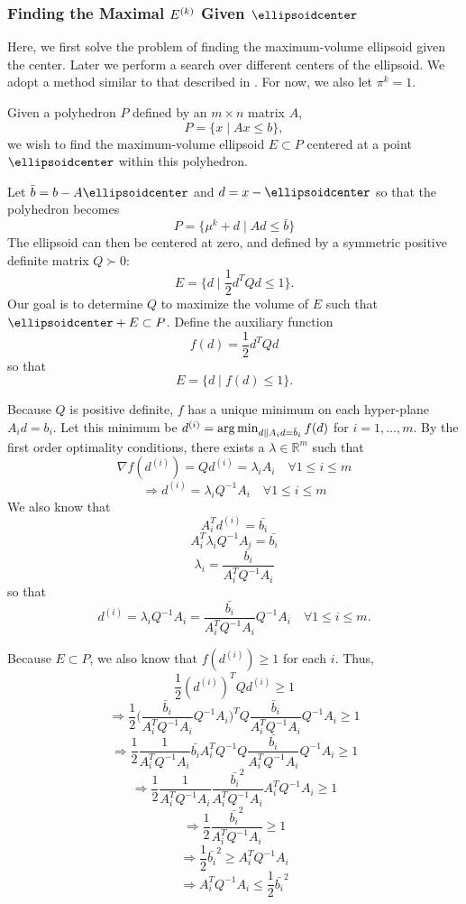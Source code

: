 \subsubsection{Finding the Maximal $ {E^{(k)}} $ Given $\ellipsoidcenter$}

\label{ellipse_optimization}

Here, we first solve the problem of finding the maximum-volume ellipsoid given the center.
Later we perform a search over different centers of the ellipsoid.
We adopt a method similar to that described in \cite{Khachiyan1993}.
For now, we also let $\pi^k = 1$.

Given a polyhedron $P$ defined by an $m \times n$ matrix $A$,
\[
P = \{ x \; | \;  Ax \le b \},
\]
we wish to find the maximum-volume ellipsoid $E \subset P$ centered at a point $\ellipsoidcenter$ within this polyhedron.

Let $\bar{b} = b - A\ellipsoidcenter$ and $d = x - \ellipsoidcenter$ so that the polyhedron becomes
\[
P = \{ \mu^k + d \; | \;  Ad \le \bar{b} \}
\]
The ellipsoid can then be centered at zero, and defined by a symmetric positive definite matrix $Q \succ 0$:
\[
E = \{ d \; | \; \frac 1 2 d^T Q d \le 1 \}.
\]
Our goal is to determine $Q$ to maximize the volume of $E$ such that $\ellipsoidcenter + E \subset P$.
Define the auxiliary function 
\[
f(d) = \frac 1 2 d^T Q d
\]
so that 
\[
E = \{ d \; | \; f(d) \le 1 \}.
\]

Because $Q$ is positive definite, $f$ has a unique minimum on each hyper-plane $A_i d = b_i$.
Let this minimum be $d^{(i)} = \operatorname*{arg\,min}_{d\| A_id =\bar{b}_i} f(d)$ for $i=1,\ldots,m$.
By the first order optimality conditions, there exists a $\lambda \in \mathbb R^m$ such that
\[
\nabla f(d^{(i)}) = Q d^{(i)} = \lambda_i A_i \quad \forall 1\le i\le m
\]
\[
\Longrightarrow d^{(i)} = \lambda_i Q^{-1}A_i \quad \forall 1\le i\le m
\]
We also know that 
\[
A_i^T d^{(i)} = \bar{b_i}
\]
\[
A_i^T \lambda_i Q^{-1}A_i = \bar{b_i}
\]
\[
\lambda_i = \frac {\bar{b_i}}{A_i^T  Q^{-1}A_i}
\]
so that 
\[
d^{(i)} = \lambda_i Q^{-1}A_i = \frac {\bar{b_i}}{A_i^T  Q^{-1}A_i}  Q^{-1}A_i \quad \forall 1\le i\le m.
\]

Because $E \subset P$, we also know that $f(d^{(i)}) \ge 1$ for each $i$. Thus,
\[
\frac 1 2 (d^{(i)})^{T} Q d^{(i)} \ge 1
\]
\[
\Longrightarrow \frac 1 2 \bigg(\frac {\bar{b}_i}{A_i^T  Q^{-1}A_i}  Q^{-1}A_i\bigg)^{T} Q \frac {\bar{b}_i}{A_i^T  Q^{-1}A_i}  Q^{-1}A_i \ge 1
\]
\[
\Longrightarrow \frac 1 2 \frac {1}{A_i^T  Q^{-1}A_i}  \bar{b_i} A_i^T Q^{-1} Q \frac {\bar{b_i}}{A_i^T  Q^{-1}A_i}  Q^{-1}A_i \ge 1
\]
\[
\Longrightarrow \frac 1 2 \frac {1}{A_i^T  Q^{-1}A_i}  \frac {\bar{b_i}^2}{A_i^T  Q^{-1}A_i}  A_i^T Q^{-1}A_i \ge 1
\]
\[
\Longrightarrow \frac 1 2  \frac {\bar{b_i}^2}{A_i^T  Q^{-1}A_i} \ge 1
\]
\[
\Longrightarrow \frac 1 2 \bar{b_i}^2\ge A_i^T  Q^{-1}A_i
\]
\[
\Longrightarrow A_i^T  Q^{-1}A_i \le \frac 1 2 \bar{b_i}^2
\]

